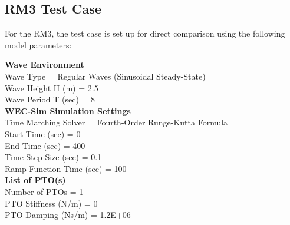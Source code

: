 \subsection{RM3 Test Case}
For the RM3, the test case is set up for direct comparison using the following model parameters:

\textbf{Wave Environment}   \\
\indent	Wave Type                            = Regular Waves (Sinusoidal Steady-State) \\
	Wave Height H                    (m) = 2.5 \\ 
	Wave Period T                  (sec) = 8 \\

\textbf{WEC-Sim Simulation Settings} \\ 
	Time Marching Solver                 = Fourth-Order Runge-Kutta Formula \\ 
	Start Time                     (sec) = 0  \\
	End Time                       (sec) = 400  \\
	Time Step Size                 (sec) = 0.1 \\
	Ramp Function Time             (sec) = 100 \\

\textbf{List of PTO(s)} \\
	Number of PTOs = 1 \\
	PTO Stiffness           (N/m) = 0 \\
	PTO Damping           (Ns/m) = 1.2E+06 \\

